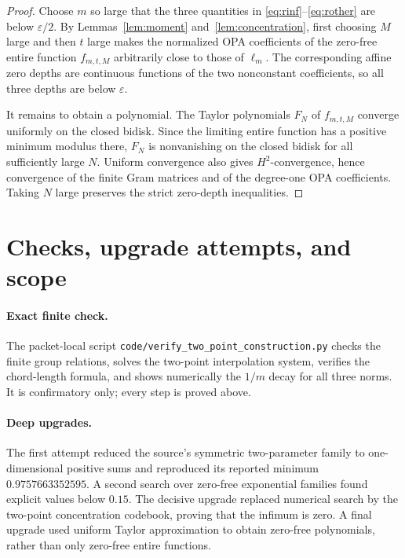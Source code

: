 \documentclass[11pt]{article}
\begin{document}
\begin{proof}
Choose \(m\) so large that the three quantities in
\eqref{eq:rinf}--\eqref{eq:rother} are below \(\varepsilon/2\). By
Lemmas~\ref{lem:moment} and~\ref{lem:concentration}, first choosing \(M\)
large and then \(t\) large makes the normalized OPA coefficients of the
zero-free entire function \(f_{m,t,M}\) arbitrarily close to those of
\(\ell_m\). The corresponding affine zero depths are continuous functions
of the two nonconstant coefficients, so all three depths are below
\(\varepsilon\).

It remains to obtain a polynomial. The Taylor polynomials \(F_N\) of
\(f_{m,t,M}\) converge uniformly on the closed bidisk. Since the limiting
entire function has a positive minimum modulus there, \(F_N\) is
nonvanishing on the closed bidisk for all sufficiently large \(N\).
Uniform convergence also gives \(H^2\)-convergence, hence convergence of the
finite Gram matrices and of the degree-one OPA coefficients. Taking \(N\)
large preserves the strict zero-depth inequalities.
\end{proof}

\section{Checks, upgrade attempts, and scope}

\paragraph{Exact finite check.}
The packet-local script \texttt{code/verify\_two\_point\_construction.py}
checks the finite group relations, solves the two-point interpolation
system, verifies the chord-length formula, and shows numerically the
\(1/m\) decay for all three norms. It is confirmatory only; every step is
proved above.

\paragraph{Deep upgrades.}
The first attempt reduced the source's symmetric two-parameter family to
one-dimensional positive sums and reproduced its reported minimum
\(0.9757663352595\). A second search over zero-free exponential families
found explicit values below \(0.15\). The decisive upgrade replaced
numerical search by the two-point concentration codebook, proving that the
infimum is zero. A final upgrade used uniform Taylor approximation to obtain
zero-free polynomials, rather than only zero-free entire functions.
\end{document}
